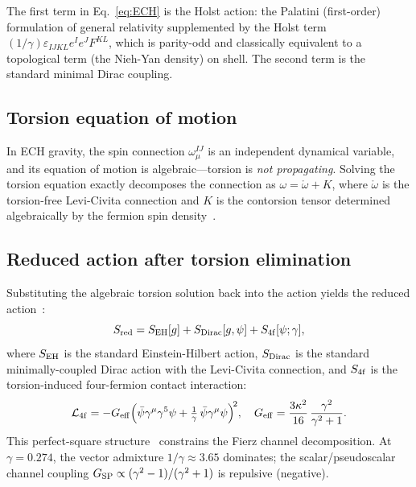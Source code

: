 \documentclass[aps,prd,twocolumn,superscriptaddress,showpacs,preprintnumbers,
  nofootinbib,longbibliography,floatfix]{revtex4-2}
\newcommand{\BI}{\gamma}
\newcommand{\Geff}{G_{\rm eff}}
\newcommand{\Gsp}{G_{\rm SP}}
\begin{document}
The first term in Eq.~\eqref{eq:ECH} is the Holst action: the Palatini
(first-order) formulation of general relativity supplemented by the Holst
term $(1/\BI)\varepsilon_{IJKL}e^I e^J F^{KL}$, which is parity-odd and
classically equivalent to a topological term (the Nieh-Yan density) on
shell. The second term is the standard minimal Dirac coupling.

\subsection{Torsion equation of motion}\label{sec:torsion}

In ECH gravity, the spin connection $\omega^{IJ}_\mu$ is an independent
dynamical variable, and its equation of motion is algebraic---torsion is
\textit{not propagating}. Solving the torsion equation exactly
decomposes the connection as $\omega = \mathring\omega + K$, where
$\mathring\omega$ is the torsion-free Levi-Civita connection and $K$ is
the contorsion tensor determined algebraically by the fermion spin
density~\cite{Freidel2005,Shapiro2002}.

\subsection{Reduced action after torsion elimination}\label{sec:reduced}

Substituting the algebraic torsion solution back into the action yields
the reduced action~\cite{Freidel2005,ShapiroTeixeira2014}:
\begin{equation}\label{eq:Sreduced}
  S_{\rm red} = S_{\rm EH}[g] + S_{\rm Dirac}[g,\psi]
  + S_{\rm 4f}[\psi;\BI],
\end{equation}
where $S_{\rm EH}$ is the standard Einstein-Hilbert action,
$S_{\rm Dirac}$ is the standard minimally-coupled Dirac action with
the Levi-Civita connection, and $S_{\rm 4f}$ is the torsion-induced
four-fermion contact interaction:
\begin{equation}\label{eq:L4f}
  \mathcal{L}_{\rm 4f}
  = -\Geff\Bigl(\bar\psi\gamma^\mu\gamma^5\psi
    + \tfrac{1}{\BI}\,\bar\psi\gamma^\mu\psi\Bigr)^{\!2},
  \quad
  \Geff = \frac{3\kappa^2}{16}\,\frac{\BI^2}{\BI^2+1}.
\end{equation}
This perfect-square structure~\cite{Golden2026supplement} constrains the
Fierz channel decomposition. At $\BI = 0.274$, the vector admixture
$1/\BI \approx 3.65$ dominates; the scalar/pseudoscalar channel coupling
$\Gsp \propto (\BI^2 - 1)/(\BI^2 + 1)$ is repulsive (negative).
\end{document}
